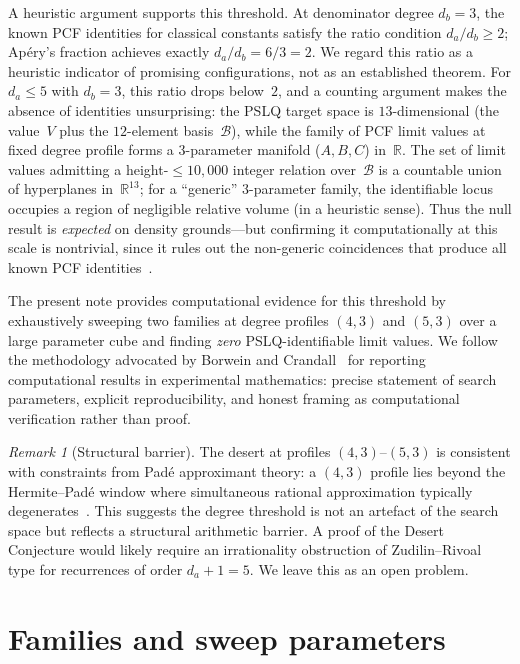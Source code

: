 \documentclass[11pt]{amsart}
\newcommand{\calB}{\mathcal{B}}
\theoremstyle{plain}
\theoremstyle{remark}
\newtheorem{remark}{Remark}
\begin{document}
A heuristic argument supports this threshold.
At denominator degree $d_b = 3$, the known PCF identities
for classical constants satisfy the ratio condition $d_a / d_b \geq 2$;
Ap\'ery's fraction achieves exactly $d_a / d_b = 6/3 = 2$.
We regard this ratio as a heuristic indicator of promising configurations,
not as an established theorem.
For $d_a \leq 5$ with $d_b = 3$, this ratio drops below~$2$,
and a counting argument makes the absence of identities
unsurprising: the PSLQ target space is $13$-dimensional
(the value~$V$ plus the $12$-element basis~$\calB$),
while the family of PCF limit values at fixed degree profile
forms a $3$-parameter manifold ($A, B, C$) in~$\mathbb{R}$.
The set of limit values admitting a height-$\leq\!10{,}000$
integer relation over~$\calB$ is a countable union of
hyperplanes in~$\mathbb{R}^{13}$;
for a ``generic'' $3$-parameter family, the identifiable
locus occupies a region of negligible relative volume
(in a heuristic sense).
Thus the null result is \emph{expected} on density grounds---but
confirming it computationally at this scale is nontrivial, since
it rules out the non-generic coincidences that produce
all known PCF identities~\cite{borwein2013}.

The present note provides computational evidence for this
threshold by exhaustively sweeping two families at degree profiles
$(4,3)$ and $(5,3)$ over a large parameter cube and finding
\emph{zero} PSLQ-identifiable limit values.
We follow the methodology advocated by Borwein and
Crandall~\cite{borwein2013} for reporting computational results
in experimental mathematics:
precise statement of search parameters, explicit reproducibility,
and honest framing as computational verification rather than proof.

\begin{remark}[Structural barrier]
The desert at profiles $(4,3)$--$(5,3)$ is consistent with
constraints from Pad\'{e} approximant theory:
a $(4,3)$ profile lies beyond the Hermite--Pad\'{e} window
where simultaneous rational approximation typically
degenerates~\cite{Baker1996}.
This suggests the degree threshold is not an artefact of the
search space but reflects a structural arithmetic barrier.
A proof of the Desert Conjecture would likely require an
irrationality obstruction of Zudilin--Rivoal type for
recurrences of order $d_a + 1 = 5$.
We leave this as an open problem.
\end{remark}

\section{Families and sweep parameters}\label{sec:setup}
\end{document}
